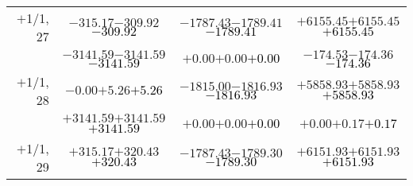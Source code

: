 \documentclass[compress]{beamer}
\begin{document}
\begin{frame}
{\begin{tabular}{r | c | c | c}
$+$1/1, 27 & $-315.17$\hspace{0.1 cm}$-309.92$\hspace{0.1 cm}\textcolor{black}{$-309.92$} & $-1787.43$\hspace{0.1 cm}$-1789.41$\hspace{0.1 cm}\textcolor{black}{$-1789.41$} & $+6155.45$\hspace{0.1 cm}$+6155.45$\hspace{0.1 cm}\textcolor{black}{$+6155.45$} \\
           & $-3141.59$\hspace{0.1 cm}$-3141.59$\hspace{0.1 cm}\textcolor{black}{$-3141.59$} & $+0.00$\hspace{0.1 cm}$+0.00$\hspace{0.1 cm}\textcolor{black}{$+0.00$} & $-174.53$\hspace{0.1 cm}$-174.36$\hspace{0.1 cm}\textcolor{black}{$-174.36$} \\
$+$1/1, 28 & $-0.00$\hspace{0.1 cm}$+5.26$\hspace{0.1 cm}\textcolor{black}{$+5.26$} & $-1815.00$\hspace{0.1 cm}$-1816.93$\hspace{0.1 cm}\textcolor{black}{$-1816.93$} & $+5858.93$\hspace{0.1 cm}$+5858.93$\hspace{0.1 cm}\textcolor{black}{$+5858.93$} \\
           & $+3141.59$\hspace{0.1 cm}$+3141.59$\hspace{0.1 cm}\textcolor{black}{$+3141.59$} & $+0.00$\hspace{0.1 cm}$+0.00$\hspace{0.1 cm}\textcolor{black}{$+0.00$} & $+0.00$\hspace{0.1 cm}$+0.17$\hspace{0.1 cm}\textcolor{black}{$+0.17$} \\
$+$1/1, 29 & $+315.17$\hspace{0.1 cm}$+320.43$\hspace{0.1 cm}\textcolor{black}{$+320.43$} & $-1787.43$\hspace{0.1 cm}$-1789.30$\hspace{0.1 cm}\textcolor{black}{$-1789.30$} & $+6151.93$\hspace{0.1 cm}$+6151.93$\hspace{0.1 cm}\textcolor{black}{$+6151.93$} \\

\end{tabular}}
\end{frame}
\end{document}
